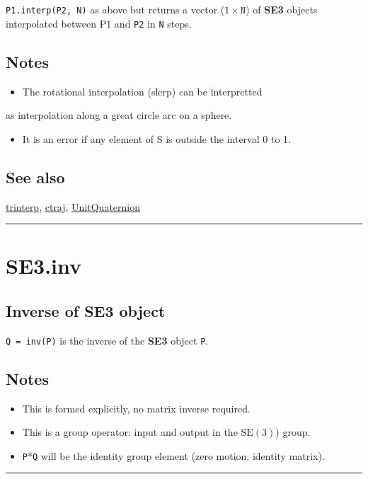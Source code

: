 \texttt{P1.interp(P2, N)} as above but returns a vector ($1 \times \texttt{N}$) of \textbf{\color{red} SE3} objects
interpolated between P1 and \texttt{P2} in \texttt{N} steps.


\subsection*{Notes}
\begin{itemize}
  \item The rotational interpolation (slerp) can be interpretted
\end{itemize}


as interpolation along a great circle arc on a sphere.

\begin{itemize}
  \item It is an error if any element of S is outside the interval 0 to 1.
\end{itemize}

\subsection*{See also}


\hyperlink{trinterp}{\color{blue} trinterp}, \hyperlink{ctraj}{\color{blue} ctraj}, \hyperlink{UnitQuaternion}{\color{blue} UnitQuaternion}

\vspace{1.5ex}\hrule

\hypertarget{SE3.inv}{\section*{SE3.inv}}
\subsection*{Inverse of SE3 object}


\texttt{Q = inv(P)} is the inverse of the \textbf{\color{red} SE3} object \texttt{P}.


\subsection*{Notes}
\begin{itemize}
  \item This is formed explicitly, no matrix inverse required.
  \item This is a group operator: input and output in the $\mbox{SE}(3)$) group.
  \item \texttt{P}*\texttt{Q} will be the identity group element (zero motion, identity matrix).
\end{itemize}
\vspace{1.5ex}\hrule

